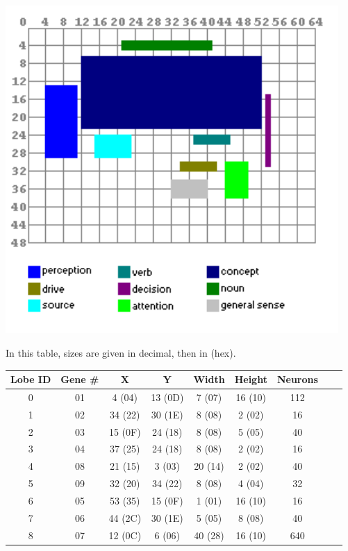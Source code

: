 \documentclass[11pt,twoside,a4paper]{article}
\begin{document}
\begin{minipage}[ht]{0.40\textwidth}
	\includegraphics[width=0.95\textwidth]{img/brainmap.png}
\end{minipage} \hfill \begin{minipage}[ht]{0.575\textwidth}
	\small
	In this table, sizes are given in decimal, then in (hex). ~\\
	\begin{tabular}[h]{|c|c|c|c|c|c|c|c|c|}
		\hline
		Lobe ID	&	Gene \#	&	X		&	Y		&	Width	&	Height	&	Neurons	\\ \hline
		0		&	01		&	4 (04)	&	13 (0D)	&	7 (07)	&	16 (10)	&	112		\\ \hline
		1		&	02		&	34 (22)	&	30 (1E)	&	8 (08)	&	2 (02)	&	16		\\ \hline
		2		&	03		&	15 (0F)	&	24 (18)	&	8 (08)	&	5 (05)	&	40		\\ \hline
		3		&	04		&	37 (25)	&	24 (18)	&	8 (08)	&	2 (02)	&	16		\\ \hline
		4		&	08		&	21 (15)	&	3 (03)	&	20 (14)	&	2 (02)	&	40		\\ \hline
		5		&	09		&	32 (20)	&	34 (22)	&	8 (08)	&	4 (04)	&	32		\\ \hline
		6		&	05		&	53 (35)	&	15 (0F)	&	1 (01)	&	16 (10)	&	16		\\ \hline
		7		&	06		&	44 (2C)	&	30 (1E)	&	5 (05)	&	8 (08)	&	40		\\ \hline
		8		&	07		&	12 (0C)	&	6 (06)	&	40 (28)	&	16 (10)	&	640		\\ \hline
	\end{tabular}
\end{minipage} ~\\
\end{document}
